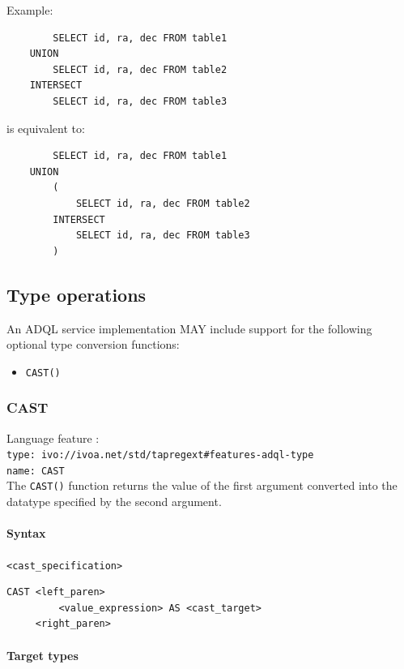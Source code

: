 \documentclass[11pt,a4paper]{ivoa}
\begin{document}
Example:

\begin{verbatim}
        SELECT id, ra, dec FROM table1
    UNION
        SELECT id, ra, dec FROM table2
    INTERSECT
        SELECT id, ra, dec FROM table3
\end{verbatim}

is equivalent to:

\begin{verbatim}
        SELECT id, ra, dec FROM table1
    UNION
        (
            SELECT id, ra, dec FROM table2
        INTERSECT
            SELECT id, ra, dec FROM table3
        )
\end{verbatim}

\subsection{Type operations}
\label{sec:type}

An ADQL service implementation MAY include support for the following optional
type conversion functions:

\begin{itemize}
    \item \verb:CAST():
\end{itemize}

\subsubsection{CAST}
\label{sec:type.cast}
{\footnotesize Language feature :}\\
{\footnotesize \verb|type: ivo://ivoa.net/std/tapregext#features-adql-type|}\\
{\footnotesize \verb|name: CAST|}\\

The \verb:CAST(): function returns the value of the first argument converted
into the datatype specified by the second argument.

\paragraph{Syntax} \verb:<cast_specification>:
\begin{verbatim}
CAST <left_paren>
         <value_expression> AS <cast_target>
     <right_paren>
\end{verbatim}

\paragraph{Target types}
\end{document}
